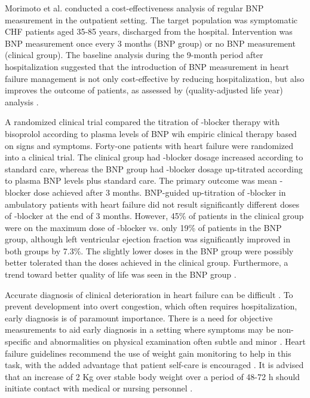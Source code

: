 \documentclass[14pt,a4paper,onecolumn]{extarticle}
\begin{document}
Morimoto et al. conducted a cost-effectiveness analysis of regular BNP measurement in the outpatient setting. The target population was symptomatic CHF patients aged 35-85 years,  discharged from the hospital. Intervention was BNP measurement once every 3 months (BNP group) or no BNP measurement (clinical group). The baseline analysis during the 9-month period after hospitalization suggested that the introduction of BNP measurement in heart failure management is not only cost-effective by reducing hospitalization, but also improves the outcome of patients, as assessed by (quality-adjusted life year) analysis \citep{bib3263}.



A  randomized clinical trial compared the titration of \beta-blocker therapy with bisoprolol according to plasma levels of BNP wih empiric clinical therapy based on signs and symptoms. Forty-one patients with heart failure were randomized into a clinical trial. The clinical group had \beta-blocker dosage increased according to standard care, whereas the BNP group had \beta-blocker dosage up-titrated according to plasma BNP levels plus standard care. The primary outcome was mean \beta-blocker dose achieved after 3 months. BNP-guided up-titration of \beta-blocker in ambulatory patients with heart failure did not result significantly different doses of \beta-blocker at the end of 3 months. However, 45\% of patients in the clinical group were on the maximum dose of \beta-blocker vs. only 19\% of patients in the BNP group, although left ventricular ejection fraction was significantly improved in both groups by 7.3\%. The slightly lower doses in the BNP group were possibly better tolerated than the doses achieved in the clinical group. Furthermore, a trend toward better quality of life was seen in the BNP group \citep{bib3294}.



Accurate diagnosis of clinical deterioration in heart failure can be difficult \citep{bib368} \citep{bib369}. To prevent development into overt congestion, which often requires hospitalization, early diagnosis is of paramount importance. There is a need for objective measurements to aid early diagnosis in a setting where symptoms may be non-specific and abnormalities on physical examination often subtle and minor \citep{bib3295}. Heart failure guidelines recommend the use of weight gain monitoring to help in this task, with the added advantage that patient self-care is encouraged \citep{bib368} \citep{bib369}. It is advised that an increase of 2 Kg over stable body weight over a period of 48-72 h should initiate contact with medical or nursing personnel \citep{bib368} \citep{bib369} \citep{bib3295}.
\end{document}
